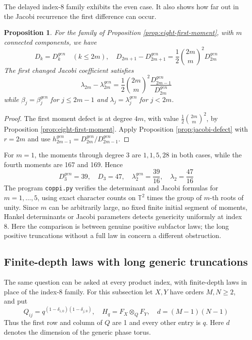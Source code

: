 \documentclass[11pt,reqno]{amsart}
\newtheorem{prop}[thm]{Proposition}
\theoremstyle{definition}
\numberwithin{equation}{section}
\begin{document}
The delayed index-8 family exhibits the even case. It also shows how far out in the Jacobi recurrence the first difference can occur.

\begin{prop}\label{prop:delayed-hankel}
For the family of Proposition \ref{prop:eight-first-moment}, with $m$ connected components, we have
$$D_k=D_k^{gen}\quad(k\leq2m),\quad D_{2m+1}-D_{2m+1}^{gen}=\frac12\binom{2m}m^2D_{2m}^{gen}$$
The first changed Jacobi coefficient satisfies
$$\lambda_{2m}-\lambda_{2m}^{gen}=\frac12\binom{2m}m^2\frac{D_{2m-1}^{gen}}{D_{2m}^{gen}}$$
while $\beta_j=\beta_j^{gen}$ for $j\leq2m-1$ and $\lambda_j=\lambda_j^{gen}$ for $j<2m$.
\end{prop}
\begin{proof}
The first moment defect is at degree $4m$, with value $\frac12\binom{2m}m^2$, by Proposition \ref{prop:eight-first-moment}. Apply Proposition \ref{prop:jacobi-defect} with $r=2m$ and use $h_{2m-1}^{gen}=D_{2m}^{gen}/D_{2m-1}^{gen}$.
\end{proof}

For $m=1$, the moments through degree 3 are $1,1,5,28$ in both cases, while the fourth moments are 167 and 169. Hence
$$D_3^{gen}=39,\quad D_3=47,\quad \lambda_2^{gen}=\frac{39}{16},\quad \lambda_2=\frac{47}{16}$$
The program \texttt{coppi.py} verifies the determinant and Jacobi formulas for $m=1,\ldots,5$, using exact character counts on $\mathbb T^2$ times the group of $m$-th roots of unity. Since $m$ can be arbitrarily large, no fixed finite initial segment of moments, Hankel determinants or Jacobi parameters detects genericity uniformly at index 8. Here the comparison is between genuine positive subfactor laws; the long positive truncations without a full law in \cite{BP26} concern a different obstruction.

\subsection{Finite-depth laws with long generic truncations}

The same question can be asked at every product index, with finite-depth laws in place of the index-8 family. For this subsection let $X,Y$ have orders $M,N\geq2$, and put
$$Q_{ij}=q^{(1-\delta_{i,0})(1-\delta_{j,0})},\quad H_q=F_X\otimes_QF_Y,\quad d=(M-1)(N-1)$$
Thus the first row and column of $Q$ are 1 and every other entry is $q$. Here $d$ denotes the dimension of the generic phase torus.
\end{document}
